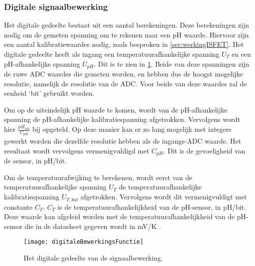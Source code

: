 \subsubsection{Digitale signaalbewerking}\label{sec:digitaal}

Het digitale gedeelte bestaat uit een aantal berekeningen. Deze berekeningen zijn nodig om de gemeten spanning om te rekenen naar een pH waarde. Hiervoor zijn een aantal kalibratiewaardes nodig, zoals besproken in \cref{sec:werkingISFET}. Het digitale gedeelte heeft als ingang een temperatuurafhankelijke spanning $U_T$ en een pH-afhankelijke spanning $U_{pH}$. Dit is te zien in \cref{fig:digitaleBewerkingsFunctie}. Beide van deze spanningen zijn de ruwe ADC waardes die gemeten worden, en hebben dus de hoogst mogelijke resolutie, namelijk de resolutie van de ADC. Voor beide van deze waardes zal de eenheid `bit' gebruikt worden.

Om op de uiteindelijk pH waarde te komen, wordt van de pH-afhankelijke spanning de pH-afhankelijke kalibratiespanning afgetrokken. Vervolgens wordt hier $\frac{pH_{kal}}{C_{pH}}$ bij opgeteld. Op deze manier kan er zo lang mogelijk met integers gewerkt worden die dezelfde resolutie hebben als de ingangs-ADC waarde. Het resultaat wordt vervolgens vermenigvuldigd met $C_{pH}$. Dit is de gevoeligheid van de sensor, in pH/bit.

Om de temperatuurafwijking te berekenen, wordt eerst van de temperatuurafhankelijke spanning $U_T$ de temperatuurafhankelijke kalibratiespanning $U_{T,kal}$ afgetrokken. Vervolgens wordt dit vermenigvuldigt met constante $C_T$. $C_T$ is de temperatuurafhankelijkheid van de pH-sensor, in pH/bit. Deze waarde kan afgeleid worden met de temperatuurafhankelijkheid van de pH-sensor die in de datasheet gegeven wordt in mV/K \cite{isfet}.

\begin{figure}[!htbp]
    \centering
    \texttt{[image: digitaleBewerkingsFunctie]}
    \caption{Het digitale gedeelte van de signaalbewerking.}
    \label{fig:digitaleBewerkingsFunctie}
\end{figure}